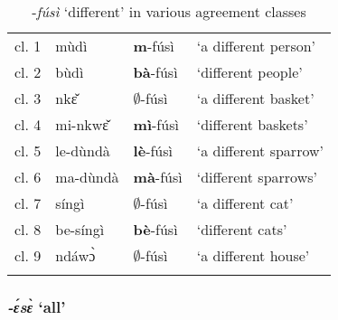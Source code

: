 \begin{table}
\begin{tabularx}{\textwidth}{XXXl}
 \lsptoprule
cl. 1 & mùdì & {\bfseries m}-fúsì  & `a different person' \\
cl. 2 & bùdì & {\bfseries bà}-fúsì & `different people' \\
cl. 3 & nkɛ̌ & {\bfseries $\emptyset$}-fúsì & `a different basket' \\
cl. 4 & mi-nkwɛ̌ & {\bfseries mì}-fúsì & `different baskets' \\
cl. 5 & le-dùndà & {\bfseries lè}-fúsì & `a different sparrow' \\
cl. 6 & ma-dùndà & {\bfseries mà}-fúsì &  `different sparrows' \\
cl. 7 & síngì & {\bfseries $\emptyset$}-fúsì & `a different cat' \\
cl. 8 & be-síngì & {\bfseries bè}-fúsì & `different cats' \\
cl. 9 & ndáwɔ̀ & {\bfseries $\emptyset$}-fúsì & `a different house' \\
 \lspbottomrule
\end{tabularx}
\caption{{\AGR}-{\itshape fúsì} `different' in various agreement classes}
\label{Tab:different}
\end{table}







\subsubsection{{\itshape -ɛ́sɛ̀} `all'} 
\label{sec:ModAll}



